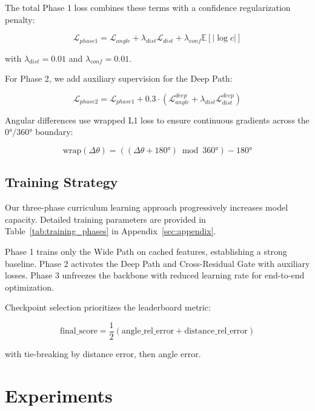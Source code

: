 \documentclass[sigconf,nonacm]{acmart}
\begin{document}
The total Phase 1 loss combines these terms with a confidence regularization penalty:

\begin{equation}
\mathcal{L}_{phase1} = \mathcal{L}_{angle} + \lambda_{dist} \mathcal{L}_{dist} + \lambda_{conf} \mathbb{E}[|\log c|]
\end{equation}

with $\lambda_{dist} = 0.01$ and $\lambda_{conf} = 0.01$.

For Phase 2, we add auxiliary supervision for the Deep Path:

\begin{equation}
\mathcal{L}_{phase2} = \mathcal{L}_{phase1} + 0.3 \cdot (\mathcal{L}_{angle}^{deep} + \lambda_{dist} \mathcal{L}_{dist}^{deep})
\end{equation}

Angular differences use wrapped L1 loss to ensure continuous gradients across the $0°/360°$ boundary:

\begin{equation}
\text{wrap}(\Delta\theta) = ((\Delta\theta + 180°) \bmod 360°) - 180°
\end{equation}

\subsection{Training Strategy}

Our three-phase curriculum learning approach progressively increases model capacity. Detailed training parameters are provided in Table~\ref{tab:training_phases} in Appendix~\ref{sec:appendix}.

Phase 1 trains only the Wide Path on cached features, establishing a strong baseline. Phase 2 activates the Deep Path and Cross-Residual Gate with auxiliary losses. Phase 3 unfreezes the backbone with reduced learning rate for end-to-end optimization.

Checkpoint selection prioritizes the leaderboard metric:

\begin{equation}
\text{final\_score} = \frac{1}{2}(\text{angle\_rel\_error} + \text{distance\_rel\_error})
\end{equation}

with tie-breaking by distance error, then angle error.

\section{Experiments}
\end{document}
